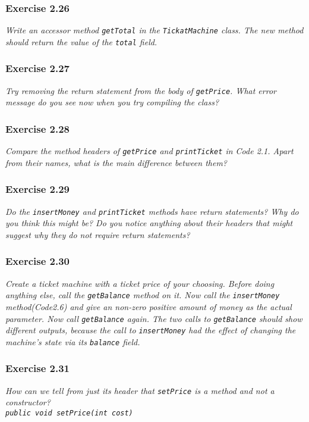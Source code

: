 \subsubsection*{Exercise 2.26}
\textit{Write an accessor method \verb?getTotal? in the \verb?TickatMachine? 
class. The new method should return the value of the \verb?total? field. }

\subsubsection*{Exercise 2.27}
\textit{Try removing the return statement from the body of \verb?getPrice?. 
What error message do you see now when you try compiling the class? }

\subsubsection*{Exercise 2.28}
\textit{Compare the method headers of \verb?getPrice? and \verb?printTicket? in 
Code 2.1. Apart from their names, what is the main difference between them? }

\subsubsection*{Exercise 2.29}
\textit{Do the \verb?insertMoney? and \verb?printTicket? methods have return 
statements? Why do you think this might be? Do you notice anything about their 
headers that might suggest why they do not require return statements? }

\subsubsection*{Exercise 2.30}
\textit{Create a ticket machine with a ticket price of your choosing. Before 
doing anything else, call the \verb?getBalance? method on it. Now call the 
\verb?insertMoney? method(Code2.6) and give an non-zero positive amount of 
money as the actual parameter. Now call \verb?getBalance? again. The two calls 
to \verb?getBalance? should show different outputs, because the call to 
\verb?insertMoney? had the effect of changing the machine's state via its 
\verb?balance? field. }

\subsubsection*{Exercise 2.31}
\textit{How can we tell from just its header that \verb?setPrice? is a method 
and not a constructor? \\
\verb?public void setPrice(int cost)?}

